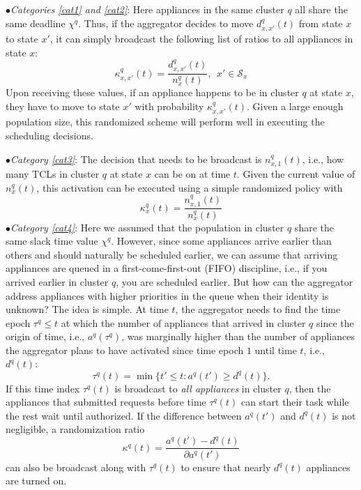 \documentclass[10pt]{IEEEtran}
\begin{document}
$\bullet${\it Categories \ref{cat1} and \ref{cat2}}: Here appliances in the same cluster $q$ all share the same deadline $\chi^q$.   Thus, if the aggregator decides to move $d_{x,x'}^q(t)$ from state $x$ to state $x'$, it can simply broadcast the following list of ratios to all appliances in state $x$:
\begin{equation}
{\kappa}_{x,x'}^q(t) = \frac{d_{x,x'}^q(t)}{n_x^q(t)},~~x'\in \mathcal S_x
\end{equation}
Upon receiving these values, if an appliance happens to be in cluster $q$ at state $x$, they have to move to state $x'$ with probability ${\kappa}_{x,x'}^q(t)$. Given a large enough population size, this randomized scheme will perform well in executing the scheduling decisions.

$\bullet${\it Category \ref{cat3}}: The decision that needs to be broadcast is  $n_{x,1}^q(t)$, i.e., how many TCLs in cluster $q$ at state $x$ can be on at time $t$. Given the current value of $n_x^q(t)$, this activation can  be executed using a simple randomized policy with
\begin{equation}
{\kappa}_{x}^q(t) = \frac{n_{x,1}^q(t)}{n_x^q(t)}
\end{equation}
$\bullet${\it Category \ref{cat4}}:
Here we assumed that  the population in cluster $q$ share the same slack time value $\chi^q$. However, since some appliances arrive earlier than others and should naturally be scheduled earlier, we can assume that arriving appliances are queued in a first-come-first-out (FIFO) discipline, i.e., if you arrived earlier in cluster $q$, you are scheduled earlier.  
But how can the aggregator address appliances with higher priorities in the queue when their identity is unknown? 
The idea is simple.  At time $t$, the aggregator needs to find the time epoch $\tau^q \leq t$ at which the number of appliances that arrived in cluster $q$ since the origin of time, i.e., $a^q(\tau^q)$,  was marginally higher than the number of appliances the aggregator plans to have activated since time epoch $1$ until time $t$, i.e., $d^q(t)$:
\begin{equation}\label{alpha2}
\tau^q(t)=\min\lbrace t' \leq t: a^q(t') \geq d^q(t)\rbrace.
\end{equation} 
If this time index $\tau^q(t)$ is broadcast to \textit{all appliances} in cluster $q$, then the appliances that  submitted requests before time $\tau^q(t)$   can start their task while the rest wait until authorized. If the difference between $a^q(t')$ and $d^q(t)$ is not negligible, a randomization ratio
\begin{equation}
{\kappa}^q(t) = \frac{ a^q(t') - d^q(t)}{\partial a^q(t')}
\end{equation}
can also be broadcast along with $\tau^q(t)$ to ensure that nearly $d^q(t)$ appliances are turned on.
 
\end{document}
